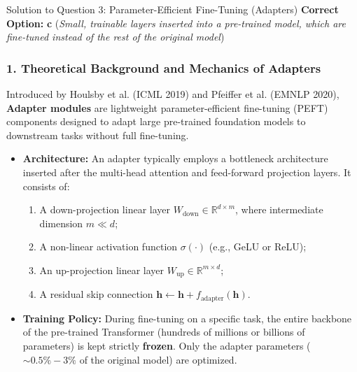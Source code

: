 \documentclass[11pt,a4paper]{article}
\begin{document}
\begin{solutionbox}{Solution to Question 3: Parameter-Efficient Fine-Tuning (Adapters)}
\textbf{Correct Option:} \textbf{c} (\textit{Small, trainable layers inserted into a pre-trained model, which are fine-tuned instead of the rest of the original model})

\subsubsection*{1. Theoretical Background and Mechanics of Adapters}
Introduced by Houlsby et al. (ICML 2019) and Pfeiffer et al. (EMNLP 2020), \textbf{Adapter modules} are lightweight parameter-efficient fine-tuning (PEFT) components designed to adapt large pre-trained foundation models to downstream tasks without full fine-tuning.
\begin{itemize}[itemsep=2pt]
    \item \textbf{Architecture:} An adapter typically employs a bottleneck architecture inserted after the multi-head attention and feed-forward projection layers. It consists of:
    \begin{enumerate}[label=\textbf{\arabic*.}]
        \item A down-projection linear layer $W_{\text{down}} \in \mathbb{R}^{d \times m}$, where intermediate dimension $m \ll d$;
        \item A non-linear activation function $\sigma(\cdot)$ (e.g., GeLU or ReLU);
        \item An up-projection linear layer $W_{\text{up}} \in \mathbb{R}^{m \times d}$;
        \item A residual skip connection $\mathbf{h} \leftarrow \mathbf{h} + f_{\text{adapter}}(\mathbf{h})$.
    \end{enumerate}
    \item \textbf{Training Policy:} During fine-tuning on a specific task, the entire backbone of the pre-trained Transformer (hundreds of millions or billions of parameters) is kept strictly \textbf{frozen}. Only the adapter parameters ($\sim 0.5\% - 3\%$ of the original model) are optimized.
\end{itemize}


\end{solutionbox}
\end{document}
